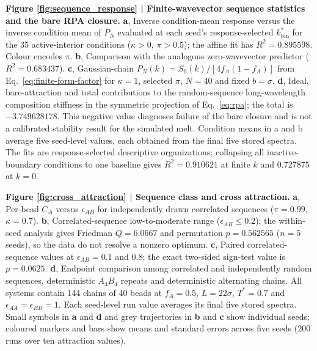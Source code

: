 \documentclass[pdflatex,sn-nature,onecolumn]{sn-jnl}
\begin{document}
\medskip
\noindent\textbf{Figure \ref{fig:sequence_response} | Finite-wavevector sequence statistics and the bare RPA closure.} \textbf{a}, Inverse condition-mean response versus the inverse condition mean of $P_N$ evaluated at each seed's response-selected $k_{\mathrm{bin}}^*$ for the 35 active-interior conditions ($\kappa>0$, $\pi>0.5$); the affine fit has $R^2=0.895598$. Colour encodes $\pi$. \textbf{b}, Comparison with the analogous zero-wavevector predictor ($R^2=0.683437$). \textbf{c}, Gaussian-chain $P_N(k)=S_0(k)/[4f_A(1-f_A)]$ from Eq.~\ref{eq:finite-form-factor} for $\kappa=1$, selected $\pi$, $N=40$ and fixed $b=\sigma$. \textbf{d}, Ideal, bare-attraction and total contributions to the random-sequence long-wavelength composition stiffness in the symmetric projection of Eq.~\ref{eq:rpa}; the total is $-3.749628178$. This negative value diagnoses failure of the bare closure and is not a calibrated stability result for the simulated melt. Condition means in a and b average five seed-level values, each obtained from the final five stored spectra. The fits are response-selected descriptive organizations; collapsing all inactive-boundary conditions to one baseline gives $R^2=0.910621$ at finite $k$ and $0.727875$ at $k=0$.

\medskip
\noindent\textbf{Figure \ref{fig:cross_attraction} | Sequence class and cross attraction.} \textbf{a}, Per-bead $C_A$ versus $\epsilon_{AB}$ for independently drawn correlated sequences ($\pi=0.99$, $\kappa=0.7$). \textbf{b}, Correlated-sequence low-to-moderate range ($\epsilon_{AB}\le0.2$); the within-seed analysis gives Friedman $Q=6.0667$ and permutation $p=0.562565$ ($n=5$ seeds), so the data do not resolve a nonzero optimum. \textbf{c}, Paired correlated-sequence values at $\epsilon_{AB}=0.1$ and 0.8; the exact two-sided sign-test value is $p=0.0625$. \textbf{d}, Endpoint comparison among correlated and independently random sequences, deterministic $A_4B_4$ repeats and deterministic alternating chains. All systems contain 144 chains of 40 beads at $f_A=0.5$, $L=22\sigma$, $T^*=0.7$ and $\epsilon_{AA}=\epsilon_{BB}=1$. Each seed-level run value averages its final five stored spectra. Small symbols in \textbf{a} and \textbf{d} and grey trajectories in \textbf{b} and \textbf{c} show individual seeds; coloured markers and bars show means and standard errors across five seeds (200 runs over ten attraction values).
\end{document}

